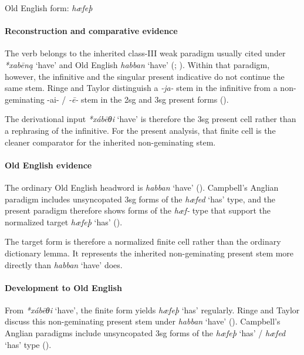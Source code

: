 \documentclass[
  british,
  a4paper,
]{article}
\providecommand{\Recon}[1]{\emph{*#1}}
\begin{document}
Old English form: \emph{hæfeþ}

\paragraph{Reconstruction and comparative
evidence}\label{reconstruction-and-comparative-evidence-124}

The verb belongs to the inherited class-III weak paradigm usually cited
under \Recon{xabēną} `have' and Old English {\emph{habban}} `have'
(;
). Within that
paradigm, however, the infinitive and the singular present indicative do
not continue the same stem. Ringe and Taylor distinguish a \emph{-ja-}
stem in the infinitive from a non-geminating -ai- / \emph{-ē-} stem in
the 2sg and 3sg present forms ().

The derivational input \Recon{xábēθi} `have' is therefore the 3sg
present cell rather than a rephrasing of the infinitive. For the present
analysis, that finite cell is the cleaner comparator for the inherited
non-geminating stem.

\paragraph{Old English evidence}\label{old-english-evidence-124}

The ordinary Old English headword is {\emph{habban}} `have'
(). Campbell's Anglian
paradigm includes unsyncopated 3sg forms of the {\emph{hæfed}} `has'
type, and the present paradigm therefore shows forms of the \emph{hæf-}
type that support the normalized target {\emph{hæfeþ}} `has'
().

The target form is therefore a normalized finite cell rather than the
ordinary dictionary lemma. It represents the inherited non-geminating
present stem more directly than {\emph{habban}} `have' does.

\paragraph{Development to Old
English}\label{development-to-old-english-124}

From \Recon{xábēθi} `have', the finite form yields {\emph{hæfeþ}} `has'
regularly. Ringe and Taylor discuss this non-geminating present stem
under {\emph{habban}} `have' (). Campbell's Anglian paradigms include unsyncopated
3sg forms of the {\emph{hæfeþ}} `has' / {\emph{hæfed}} `has' type
().
\end{document}
